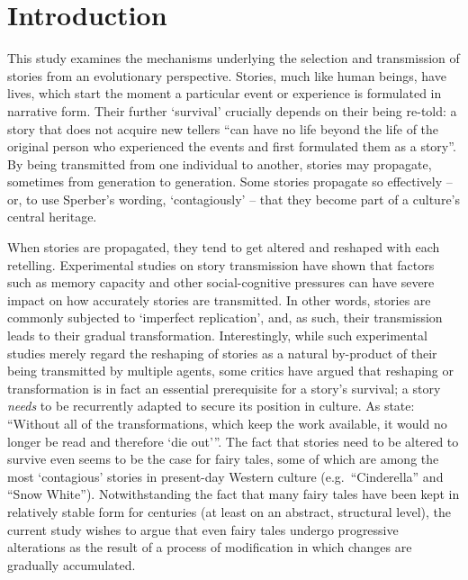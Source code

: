 
\chapter{Introduction} \label{ch:introduction}


\vspace{3.5ex plus 1ex minus .2ex}
\noindent This study examines the mechanisms underlying the selection and transmission of stories from an evolutionary perspective. Stories, much like human beings, have lives, which start the moment a particular event or experience is formulated in narrative form. Their further `survival' crucially depends on their being re-told: a story that does not acquire new tellers ``can have no life beyond the life of the original person who experienced the events and first formulated them as a story''\autocite{linde:2009}. By being transmitted from one individual to another, stories may propagate, sometimes from generation to generation. Some stories propagate so effectively -- or, to use Sperber's wording, `contagiously' -- that they become part of a culture's central heritage. 

When stories are propagated, they tend to get altered and reshaped with each retelling. Experimental studies on story transmission have shown that factors such as memory capacity and other social-cognitive pressures can have severe impact on how accurately stories are transmitted.\autocite{bartlett,mesoudiwhiten:2010,breithaupt:2015} In other words, stories are commonly subjected to `imperfect replication', and, as such, their transmission leads to their gradual transformation. Interestingly, while such experimental studies merely regard the reshaping of stories as a natural by-product of their being transmitted by multiple agents, some critics have argued that reshaping or transformation is in fact an essential prerequisite for a story's survival; a story \emph{needs} to be recurrently adapted to secure its position in culture\autocite{stephens_mccallum,collins_ridgman}. As \citeauthor{geerts_bossche} state: ``Without all of the transformations, which keep the work available, it would no longer be read and therefore `die out'''.\autocite{geerts_bossche} The fact that stories need to be altered to survive even seems to be the case for fairy tales, some of which are among the most `contagious' stories in present-day Western culture (e.g.\ ``Cinderella'' and ``Snow White''). Notwithstanding the fact that many fairy tales have been kept in relatively stable form for centuries (at least on an abstract, structural level), the current study wishes to argue that even fairy tales undergo progressive alterations as the result of a process of modification in which changes are gradually accumulated.

